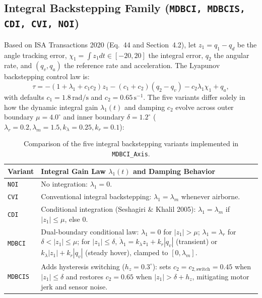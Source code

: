 \documentclass[11pt,a4paper]{article}
\begin{document}
\subsection{Integral Backstepping Family (\texttt{MDBCI, MDBCIS, CDI, CVI, NOI})}
Based on ISA Transactions 2020 (Eq.~44 and Section~4.2), let $z_1 = q_1 - q_d$ be the angle tracking error, $\chi_1 = \int z_1 dt \in [-20, 20]$ the integral error, $q_2$ the angular rate, and $(q_v, q_a)$ the reference rate and acceleration. The Lyapunov backstepping control law is:
\begin{equation}
  \tau = -(1 + \lambda_1 + c_1 c_2)z_1 - (c_1 + c_2)(q_2 - q_v) - c_2 \lambda_1 \chi_1 + q_a,
\end{equation}
with defaults $c_1 = 1.8\,\text{rad/s}$ and $c_2 = 0.65\,\text{s}^{-1}$. The five variants differ solely in how the dynamic integral gain $\lambda_1(t)$ and damping $c_2$ evolve across outer boundary $\mu = 4.0^\circ$ and inner boundary $\delta = 1.2^\circ$ ($\lambda_r = 0.2, \lambda_m = 1.5, k_\lambda = 0.25, k_r = 0.1$):
\begin{table}[htbp]
\centering
\small
\begin{tabularx}{\textwidth}{@{}lX@{}}
\toprule
\textbf{Variant} & \textbf{Integral Gain Law $\lambda_1(t)$ and Damping Behavior} \\
\midrule
\texttt{NOI} & No integration: $\lambda_1 = 0$. \\
\texttt{CVI} & Conventional integral backstepping: $\lambda_1 = \lambda_m$ whenever airborne. \\
\texttt{CDI} & Conditional integration (Seshagiri \& Khalil 2005): $\lambda_1 = \lambda_m$ if $|z_1| \le \mu$, else $0$. \\
\texttt{MDBCI} & Dual-boundary conditional law: $\lambda_1 = 0$ for $|z_1| > \mu$; $\lambda_1 = \lambda_r$ for $\delta < |z_1| \le \mu$; for $|z_1| \le \delta$, $\dot{\lambda}_1 = k_\lambda z_1 + k_r|q_v|$ (transient) or $k_\lambda |z_1| + k_r|q_v|$ (steady hover), clamped to $[0, \lambda_m]$. \\
\texttt{MDBCIS} & Adds hysteresis switching ($h_z = 0.3^\circ$): sets $c_2 = c_{2,\text{switch}} = 0.45$ when $|z_1| \le \delta$ and restores $c_2 = 0.65$ when $|z_1| > \delta + h_z$, mitigating motor jerk and sensor noise. \\
\bottomrule
\end{tabularx}
\caption{Comparison of the five integral backstepping variants implemented in \texttt{MDBCI\_Axis}.}
\label{tab:backstepping}
\end{table}
\end{document}
